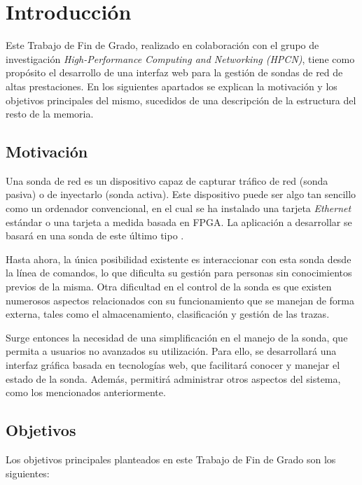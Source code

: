 \chapter{Introducción}

Este Trabajo de Fin de Grado, realizado en colaboración con el grupo de investigación \textit{High-Performance Computing and Networking (HPCN)}, tiene como propósito el desarrollo de una interfaz web para la gestión de sondas de red de altas prestaciones.
En los siguientes apartados se explican la motivación y los objetivos principales del mismo, sucedidos de una descripción de la estructura del resto de la memoria.

\section{Motivación}

Una sonda de red es un dispositivo capaz de capturar tráfico de red (sonda pasiva) o de inyectarlo (sonda activa).
Este dispositivo puede ser algo tan sencillo como un ordenador convencional, en el cual se ha instalado una tarjeta \textit{Ethernet} estándar o una tarjeta a medida basada en \gls{FPGA}.
La aplicación a desarrollar se basará en una sonda de este último tipo \cite{jfzazo}.

Hasta ahora, la única posibilidad existente es interaccionar con esta sonda desde la línea de comandos, lo que dificulta su gestión para personas sin conocimientos previos de la misma.
Otra dificultad en el control de la sonda es que existen numerosos aspectos relacionados con su funcionamiento que se manejan de forma externa, tales como el almacenamiento, clasificación y gestión de las \glspl{traza}.

Surge entonces la necesidad de una simplificación en el manejo de la sonda, que permita a usuarios no avanzados su utilización.
Para ello, se desarrollará una interfaz gráfica basada en tecnologías web, que facilitará conocer y manejar el estado de la sonda. Además, permitirá administrar otros aspectos del sistema, como los mencionados anteriormente.

\section{Objetivos}

Los objetivos principales planteados en este Trabajo de Fin de Grado son los siguientes:

